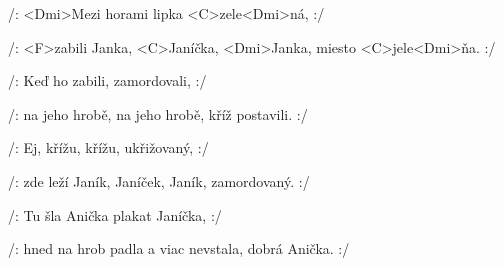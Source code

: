 

\zs
/: <Dmi>Mezi horami
lipka <C>zele<Dmi>ná, :/

/: <F>zabili Janka,
<C>Janíčka, <Dmi>Janka,
miesto <C>jele<Dmi>ňa. :/
\ks

\zs
/: Keď ho zabili,
zamordovali, :/

/: na jeho hrobě,
na jeho hrobě,
kříž postavili. :/
\ks

\zs
/: Ej, křížu, křížu,
ukřižovaný, :/

/: zde leží Janík,
Janíček, Janík,
zamordovaný. :/
\ks

\zs
/: Tu šla Anička
plakat Janíčka, :/

/: hned na hrob padla
a viac nevstala,
dobrá Anička. :/
\ks

\kp
